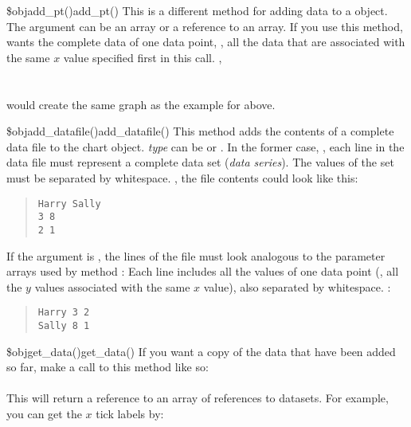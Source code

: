 \begin{MethDecl}{\$obj\deref add\_pt()}{add\_pt()}
This is a different method for adding data to a
\chart object. The argument can be an array or a reference to an
array. If you use this method, \chart wants the complete data of
one data point, \ie, all the data that are associated with the same $x$
value specified first in this call. \Eg,\\
\\
\\
would create the same graph as the example for  above.
\end{MethDecl}

\begin{MethDecl}{\$obj\deref add\_datafile()}{add\_datafile()}
This method adds the contents of a complete data file to the chart object.
\textit{type} can be  or .
In the former case, , each line in the data file must
represent a complete data set (\emph{data series}). The values of the set
must be separated by whitespace. \Eg, the file contents could look like
this:
\begin{quote}
\texttt{Harry  Sally}\\
\texttt{3      8}\\
\texttt{2      1}
\end{quote}

If the argument is , the lines of the file must look
analogous to the parameter arrays used by method :
Each line includes all the values of one data point (\ie, all the $y$
values associated with the same $x$ value), also separated by
whitespace. \Eg:
\begin{quote}
\small
\texttt{Harry 3 2}\\
\texttt{Sally 8 1}
\end{quote}
\end{MethDecl}

\begin{MethDecl}{\$obj\deref get\_data()}{get\_data()}
If you want a copy of the data that have been added
so far, make a call to this method like so:\\
\\[\itemabstand]
This will return a reference to an array of references to
datasets. For example, you can get the $x$ tick labels by:\\
\end{MethDecl}


